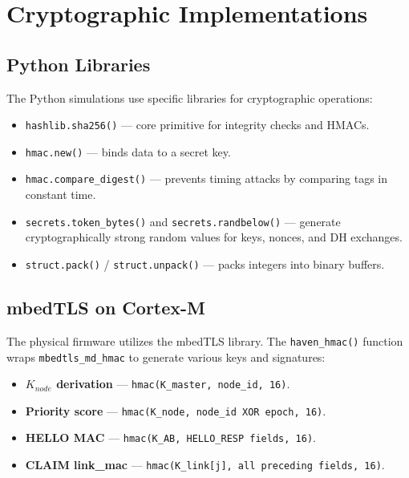 \documentclass[11pt,a4paper]{article}
\newcommand{\citeref}[1]{}
\begin{document}
\section{Cryptographic Implementations}

\subsection{Python Libraries}

The Python simulations use specific libraries for cryptographic operations:\citeref{4}

\begin{itemize}
\item \texttt{hashlib.sha256()} --- core primitive for integrity checks and HMACs.
\item \texttt{hmac.new()} --- binds data to a secret key.
\item \texttt{hmac.compare\_digest()} --- prevents timing attacks by comparing tags in constant time.
\item \texttt{secrets.token\_bytes()} and \texttt{secrets.randbelow()} --- generate cryptographically strong random values for keys, nonces, and DH exchanges.
\item \texttt{struct.pack()} / \texttt{struct.unpack()} --- packs integers into binary buffers.
\end{itemize}

\subsection{mbedTLS on Cortex-M}

The physical firmware utilizes the mbedTLS library.\citeref{4} The \texttt{haven\_hmac()} function wraps \linebreak\texttt{mbedtls\_md\_hmac} to generate various keys and signatures:

\begin{itemize}
\item \textbf{$K_{node}$ derivation} --- \texttt{hmac(K\_master, node\_id, 16)}.
\item \textbf{Priority score} --- \texttt{hmac(K\_node, node\_id XOR epoch, 16)}.
\item \textbf{HELLO MAC} --- \texttt{hmac(K\_AB, HELLO\_RESP fields, 16)}.
\item \textbf{CLAIM link\_mac} --- \texttt{hmac(K\_link[j], all preceding fields, 16)}.
\end{itemize}
\end{document}
